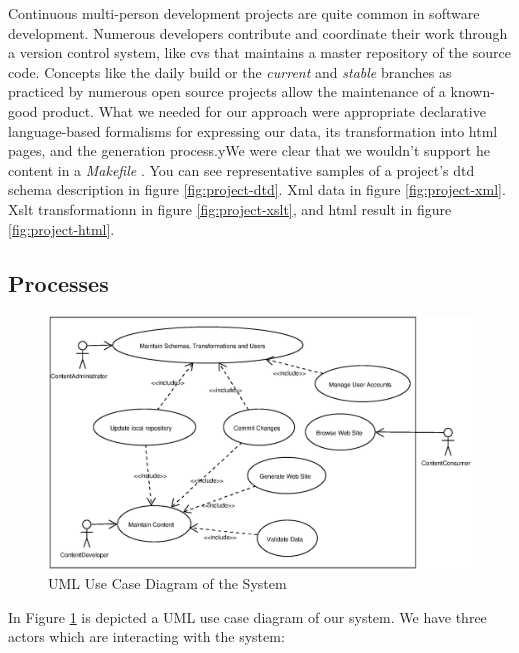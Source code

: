 \documentclass[10pt]{article}
\begin{document}
Continuous multi-person development projects are quite
common in software development.
Numerous developers contribute and coordinate their work
through a version control system, like {\sc cvs} that
maintains a master repository of the source code.
Concepts like the daily build \cite{CS95b} or the
{\em current} and {\em stable} branches as practiced by
numerous open source projects allow the maintenance
of a known-good product.
What we needed for our approach were appropriate
declarative language-based formalisms for expressing our data,
its transformation into {\sc html} pages, and the
generation process.yWe were clear that we wouldn't support he content in a {\em Makefile} \cite{OTT91}.
You can see representative samples of a project's
{\sc dtd} schema description in figure \ref{fig:project-dtd}.
{\sc Xml} data in figure \ref{fig:project-xml}.
{\sc Xslt} transformationn in figure \ref{fig:project-xslt},
and {\sc html} result in figure \ref{fig:project-html}.

\subsection{Processes}

\begin{figure}
\includegraphics[scale=0.5]{use-case-diagram}
\caption{UML Use Case Diagram of the System}
\label{fig:use-case-diagram}
\end{figure}

In Figure \ref{fig:use-case-diagram} is depicted a UML use case diagram of our system. 
We have three actors which are interacting with the system:
\end{document}
